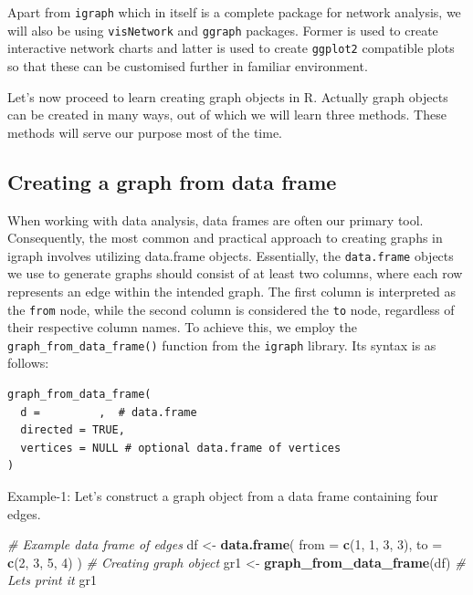\documentclass[
]{book}
\newenvironment{Shaded}{\begin{snugshade}}{\end{snugshade}}
\newcommand{\AttributeTok}[1]{\textcolor[rgb]{0.13,0.29,0.53}{#1}}
\newcommand{\CommentTok}[1]{\textcolor[rgb]{0.56,0.35,0.01}{\textit{#1}}}
\newcommand{\DecValTok}[1]{\textcolor[rgb]{0.00,0.00,0.81}{#1}}
\newcommand{\FunctionTok}[1]{\textcolor[rgb]{0.13,0.29,0.53}{\textbf{#1}}}
\newcommand{\NormalTok}[1]{#1}
\newcommand{\OtherTok}[1]{\textcolor[rgb]{0.56,0.35,0.01}{#1}}
\begin{document}
Apart from \texttt{igraph} which in itself is a complete package for network analysis, we will also be using \texttt{visNetwork} and \texttt{ggraph} packages. Former is used to create interactive network charts and latter is used to create \texttt{ggplot2} compatible plots so that these can be customised further in familiar environment.

Let's now proceed to learn creating graph objects in R. Actually graph objects can be created in many ways, out of which we will learn three methods. These methods will serve our purpose most of the time.

\hypertarget{creating-a-graph-from-data-frame}{%
\subsection{Creating a graph from data frame}\label{creating-a-graph-from-data-frame}}

When working with data analysis, data frames are often our primary tool. Consequently, the most common and practical approach to creating graphs in igraph involves utilizing data.frame objects. Essentially, the \texttt{data.frame} objects we use to generate graphs should consist of at least two columns, where each row represents an edge within the intended graph. The first column is interpreted as the \texttt{\textquotesingle{}from\textquotesingle{}} node, while the second column is considered the \texttt{\textquotesingle{}to\textquotesingle{}} node, regardless of their respective column names. To achieve this, we employ the \texttt{graph\_from\_data\_frame()} function from the \texttt{igraph} library. Its syntax is as follows:

\begin{verbatim}
graph_from_data_frame(
  d =         ,  # data.frame
  directed = TRUE,
  vertices = NULL # optional data.frame of vertices
)
\end{verbatim}

Example-1: Let's construct a graph object from a data frame containing four edges.

\begin{Shaded}
\begin{Highlighting}[]
\CommentTok{\# Example data frame of edges}
\NormalTok{df }\OtherTok{\textless{}{-}} \FunctionTok{data.frame}\NormalTok{(}
  \AttributeTok{from =} \FunctionTok{c}\NormalTok{(}\DecValTok{1}\NormalTok{, }\DecValTok{1}\NormalTok{, }\DecValTok{3}\NormalTok{, }\DecValTok{3}\NormalTok{),}
  \AttributeTok{to =} \FunctionTok{c}\NormalTok{(}\DecValTok{2}\NormalTok{, }\DecValTok{3}\NormalTok{, }\DecValTok{5}\NormalTok{, }\DecValTok{4}\NormalTok{)}
\NormalTok{)}
\CommentTok{\# Creating graph object}
\NormalTok{gr1 }\OtherTok{\textless{}{-}} \FunctionTok{graph\_from\_data\_frame}\NormalTok{(df)}
\CommentTok{\# Let\textquotesingle{}s print it}
\NormalTok{gr1}
\end{Highlighting}
\end{Shaded}
\end{document}

